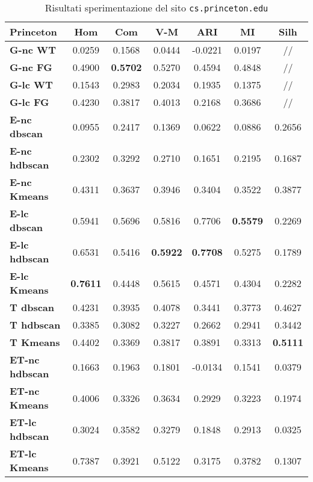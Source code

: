 \begin{table}[H]
	\begin{tabular}{| l | c | c | c | c | c | c |}
	\hline
	\textbf{Princeton}  & \textbf{Hom} & \textbf{Com} & \textbf{V-M}  & \textbf{ARI}  & \textbf{MI}  & \textbf{Silh} \\ [3ex] \hline
	\textbf{G-nc WT} & 0.0259 & 0.1568 & 0.0444 & -0.0221 & 0.0197 & // \\ [2ex]
	 \hline
	\textbf{G-nc FG} & 0.4900 & \textbf{0.5702} & 0.5270 & 0.4594 & 0.4848 & // \\ [2ex]
	 \hline	
	\textbf{G-lc WT} & 0.1543 & 0.2983 & 0.2034 & 0.1935 & 0.1375 & // \\ [2ex]
	 \hline	
	\textbf{G-lc FG} & 0.4230 & 0.3817 & 0.4013 & 0.2168 & 0.3686 & // \\ [2ex]
	\hline
	
	\textbf{E-nc dbscan} & 0.0955 & 0.2417 & 0.1369 & 0.0622 & 0.0886 & 0.2656\\ [2ex]
	 \hline 
	\textbf{E-nc hdbscan} & 0.2302 & 0.3292 & 0.2710 & 0.1651 & 0.2195 & 0.1687\\ [2ex]
	 \hline
	\textbf{E-nc Kmeans} & 0.4311 & 0.3637 & 0.3946 & 0.3404 & 0.3522 & 0.3877\\ [2ex]
	 \hline	
	\textbf{E-lc dbscan} & 0.5941 & 0.5696 & 0.5816 & 0.7706 & \textbf{0.5579} & 0.2269\\ [2ex]
	\hline
	\textbf{E-lc hdbscan} & 0.6531 & 0.5416 & \textbf{0.5922} & \textbf{0.7708} & 0.5275 & 0.1789\\ [2ex]
	\hline
	\textbf{E-lc Kmeans} & \textbf{0.7611} & 0.4448 & 0.5615 & 0.4571 & 0.4304 & 0.2282\\ [2ex]
	\hline
	
	\textbf{T dbscan} & 0.4231 & 0.3935 & 0.4078 & 0.3441 & 0.3773 & 0.4627\\ [2ex]
	 \hline 
	\textbf{T hdbscan} & 0.3385 & 0.3082 & 0.3227 & 0.2662 & 0.2941 & 0.3442\\ [2ex]
	 \hline
	\textbf{T Kmeans} & 0.4402 & 0.3369 & 0.3817 & 0.3891 & 0.3313 & \textbf{0.5111}\\ [2ex]
	 \hline
	
	\textbf{ET-nc hdbscan} & 0.1663 & 0.1963 & 0.1801 & -0.0134 & 0.1541 & 0.0379\\ [2ex]
	 \hline
	\textbf{ET-nc Kmeans} & 0.4006 & 0.3326 & 0.3634 & 0.2929 & 0.3223 & 0.1974\\ [2ex]
	 \hline	
	\textbf{ET-lc hdbscan} & 0.3024 & 0.3582 & 0.3279 & 0.1848 & 0.2913 & 0.0325\\ [2ex]
	\hline
	\textbf{ET-lc Kmeans} & 0.7387 & 0.3921 & 0.5122 & 0.3175 & 0.3782 & 0.1307\\ [2ex]
	\hline
	
	\end{tabular}
	\caption{Risultati sperimentazione del sito \texttt{cs.princeton.edu}}
	\label{metrichePrinc}
\end{table}

